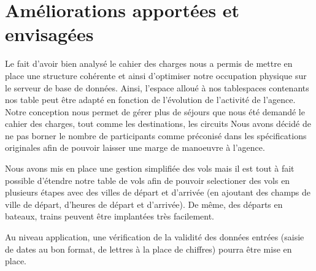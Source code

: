 \section{Am\'eliorations apport\'ees et envisag\'ees}

Le fait d'avoir bien analys\'e le cahier des charges nous a permis de mettre en place une structure coh\'erente et ainsi d'optimiser notre occupation physique sur le serveur de base de donn\'ees.
Ainsi, l'espace allou\'e \`a nos tablespaces contenants nos table peut \^etre adapt\'e en fonction de l'\'evolution de l'activit\'e de l'agence.\\

Notre conception nous permet de g\'erer plus de s\'ejours que nous \'et\'e demand\'e le cahier des charges, tout comme les destinations, les circuits
Nous avons d\'ecid\'e de ne pas borner le nombre de participants comme pr\'econis\'e dans les sp\'ecifications originales afin de pouvoir laisser une marge de manoeuvre \`a l'agence.

Nous avons mis en place une gestion simplifi\'ee des vols mais  il est tout \`a fait possible d'\'etendre notre table de vols afin de pouvoir selectioner des vols en plusieurs \'etapes avec des villes de d\'epart et d'arriv\'ee (en ajoutant des champs de ville de d\'epart, d'heures de d\'epart et d'arriv\'ee).
De m\^eme, des d\'eparts en bateaux, trains peuvent \^etre implant\'ees tr\`es facilement.

Au niveau application, une v\'erification de la validit\'e des donn\'ees entr\'ees (saisie de dates au bon format, de lettres \`a la place de chiffres) pourra \^etre mise en place.

